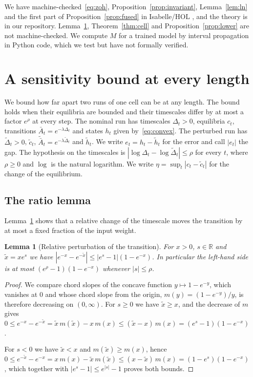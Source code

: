 \documentclass[11pt, a4paper]{article}
\newtheorem{lemma}[proposition]{Lemma}
\theoremstyle{remark}
\theoremstyle{plain}
\newcommand{\Abar}{\bar{A}}
\begin{document}
We have machine-checked~\eqref{eq:zoh}, Proposition~\ref{prop:invariant}, Lemma~\ref{lem:ln} and
the first part of Proposition~\ref{prop:fused} in Isabelle/HOL \citep{nipkow2002isabelle}, and the
theory is in our repository. Lemma~\ref{lem:ratio}, Theorem~\ref{thm:cell} and
Proposition~\ref{prop:lower} are not machine-checked. We compute $M$ for a trained model by
interval propagation in Python code, which we test but have not formally verified.

\section{A sensitivity bound at every length}
\label{sec:sensitivity}

We bound how far apart two runs of one cell can be at any length. The bound holds when their
equilibria are bounded and their timescales differ by at most a factor $e^{\rho}$ at every step.
The nominal run has timescales $\Delta_t > 0$, equilibria $c_t$, transitions
$\Abar_t = e^{-\lambda\Delta_t}$ and states $h_t$ given by~\eqref{eq:convex}. The perturbed run
has $\tilde\Delta_t > 0$, $\tilde c_t$, $\tilde{\Abar}_t = e^{-\lambda\tilde\Delta_t}$ and
$\tilde h_t$. We write
$e_t = h_t - \tilde h_t$ for the error and call $|e_t|$ the gap. The hypothesis on the timescales
is $|\log\Delta_t - \log\tilde\Delta_t| \le \rho$ for every $t$, where $\rho \ge 0$ and $\log$ is
the natural logarithm. We write $\eta = \sup_t |c_t - \tilde c_t|$ for the change of the
equilibrium.

\subsection{The ratio lemma}

Lemma~\ref{lem:ratio} shows that a relative change of the timescale moves the transition by at most
a fixed fraction of the input weight.

\begin{lemma}[Relative perturbation of the transition]
\label{lem:ratio}
For $x > 0$, $s \in \mathbb{R}$ and $\tilde x = x e^{s}$ we have
$|e^{-x} - e^{-\tilde x}| \le |e^{s} - 1|(1 - e^{-x})$. In particular the left-hand side is at
most $(e^{\rho} - 1)(1 - e^{-x})$ whenever $|s| \le \rho$.
\end{lemma}

\begin{proof}
We compare chord slopes of the concave function $y \mapsto 1 - e^{-y}$, which vanishes at $0$
and whose chord slope from the origin, $m(y) = (1 - e^{-y})/y$, is therefore decreasing on
$(0, \infty)$. For $s \ge 0$ we have $\tilde x \ge x$, and the decrease of $m$ gives
$0 \le e^{-x} - e^{-\tilde x} = \tilde x\, m(\tilde x) - x\, m(x) \le (\tilde x - x)\, m(x)
= (e^{s} - 1)(1 - e^{-x})$.

For $s < 0$ we have $\tilde x < x$ and $m(\tilde x) \ge m(x)$, hence
$0 \le e^{-\tilde x} - e^{-x} = x\, m(x) - \tilde x\, m(\tilde x) \le (x - \tilde x)\, m(x)
= (1 - e^{s})(1 - e^{-x})$, which together with $|e^{s} - 1| \le e^{|s|} - 1$ proves both
bounds.
\end{proof}
\end{document}
